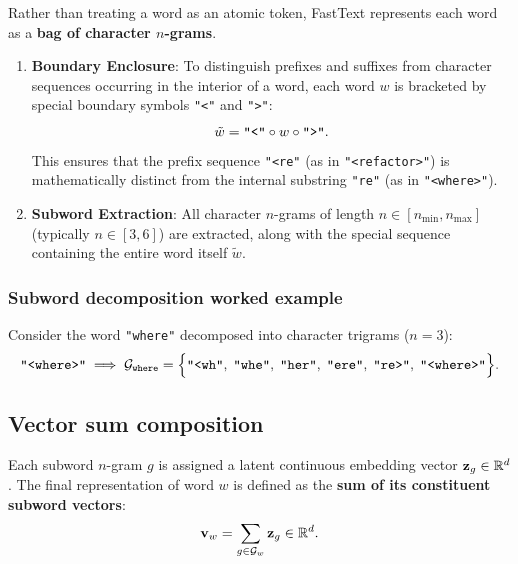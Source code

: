 \documentclass[../../main.tex]{subfiles}
\begin{document}
Rather than treating a word as an atomic token, FastText represents each word as a \textbf{bag of character $n$-grams}.

\begin{enumerate}
    \item \textbf{Boundary Enclosure}: To distinguish prefixes and suffixes from character sequences occurring in the interior of a word, each word $w$ is bracketed by special boundary symbols \texttt{"<"} and \texttt{">"}:
    \begin{equation}
    \label{eq:boundary_enclosure}
    \tilde{w} = \text{\texttt{"<"}} \circ w \circ \text{\texttt{">"}}.
    \end{equation}
    This ensures that the prefix sequence \texttt{"<re"} (as in \texttt{"<refactor>"}) is mathematically distinct from the internal substring \texttt{"re"} (as in \texttt{"<where>"}).
    
    \item \textbf{Subword Extraction}: All character $n$-grams of length $n \in [n_{\min}, n_{\max}]$ (typically $n \in [3, 6]$) are extracted, along with the special sequence containing the entire word itself $\tilde{w}$.
\end{enumerate}

\subsubsection{Subword decomposition worked example}
Consider the word \texttt{"where"} decomposed into character trigrams ($n = 3$):
\begin{equation}
\label{eq:fasttext_subwords}
\text{\texttt{"<where>"}} \implies \mathcal{G}_{\text{\texttt{where}}} = \Big\{ \text{\texttt{"<wh"}}, \; \text{\texttt{"whe"}}, \; \text{\texttt{"her"}}, \; \text{\texttt{"ere"}}, \; \text{\texttt{"re>"}}, \; \text{\texttt{"<where>"}} \Big\}.
\end{equation}

\subsection{Vector sum composition}
\label{subsec:fasttext_composition}

Each subword $n$-gram $g$ is assigned a latent continuous embedding vector $\mathbf{z}_g \in \mathbb{R}^d$. The final representation of word $w$ is defined as the \textbf{sum of its constituent subword vectors}:
\begin{equation}
\label{eq:fasttext_sum}
\mathbf{v}_w = \sum_{g \in \mathcal{G}_w} \mathbf{z}_g \in \mathbb{R}^d.
\end{equation}
\end{document}
